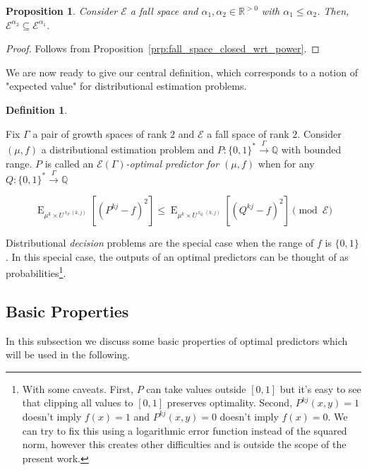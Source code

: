 \documentclass{article}
\numberwithin{equation}{section}
\theoremstyle{definition}
\newtheorem{definition}{Definition}[section]
\theoremstyle{plain}
\newtheorem{proposition}{Proposition}[section]
\newcommand{\Words}{{\{ 0, 1 \}^*}}
\newcommand{\Bool}{\{0,1\}}
\DeclareMathOperator{\E}{E}
\DeclareMathOperator{\R}{r}
\newcommand{\Rats}{\mathbb{Q}}
\newcommand{\Reals}{\mathbb{R}}
\newcommand{\Fall}{\mathcal{E}}
\newcommand{\Scheme}{\xrightarrow{\Gamma}}
\begin{document}
\begin{proposition}

Consider $\Fall$ a fall space and $\alpha_1,\alpha_2 \in \Reals^{>0}$ with $\alpha_1 \leq \alpha_2$. Then, ${\Fall^{\alpha_2} \subseteq \Fall^{\alpha_1}}$.

\end{proposition}

\begin{proof}

Follows from Proposition~\ref{prp:fall_space_closed_wrt_power}.

\end{proof}

We are now ready to give our central definition, which corresponds to a notion of "expected value" for distributional estimation problems.

\begin{definition}
\label{def:op}

Fix $\Gamma$ a pair of growth spaces of rank $2$ and $\Fall$ a fall space of rank $2$. Consider $(\mu,f)$ a distributional estimation problem and $P: \Words \Scheme \Rats$ with bounded range. $P$ is called an \emph{$\Fall(\Gamma)$-optimal predictor for $(\mu,f)$} when for any $Q: \Words \Scheme \Rats$

\begin{equation}
\label{eqn:op}
\E_{\mu^k \times U^{\R_P(k,j)}}[(P^{kj} - f)^2] \leq \E_{\mu^k \times U^{\R_Q(k,j)}}[(Q^{kj} - f)^2] \pmod \Fall
\end{equation}

\end{definition}

Distributional \emph{decision} problems are the special case when the range of $f$ is $\Bool$. In this special case, the outputs of an optimal predictors can be thought of as probabilities\footnote{With some caveats. First, $P$ can take values outside $[0,1]$ but it's easy to see that clipping all values to $[0,1]$ preserves optimality. Second, $P^{kj}(x,y)=1$ doesn't imply $f(x) = 1$ and $P^{kj}(x,y)=0$ doesn't imply $f(x)=0$. We can try to fix this using a logarithmic error function instead of the squared norm, however this creates other difficulties and is outside the scope of the present work.}.

\subsection{Basic Properties}

In this subsection we discuss some basic properties of optimal predictors which will be used in the following.
\end{document}
